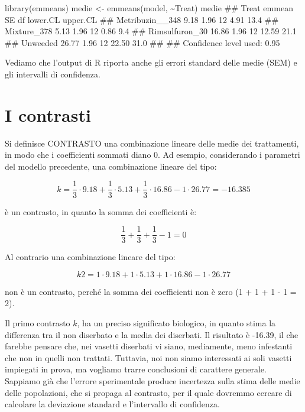 \documentclass[a4paper,12pt,oneside]{book}
\newenvironment{Shaded}{\begin{snugshade}}{\end{snugshade}}
\newcommand{\SpecialCharTok}[1]{#1}
\newcommand{\DocumentationTok}[1]{#1}
\newcommand{\OtherTok}[1]{#1}
\newcommand{\FunctionTok}[1]{#1}
\newcommand{\NormalTok}[1]{#1}
\begin{document}
\begin{Shaded}
\begin{Highlighting}[]
\FunctionTok{library}\NormalTok{(emmeans)}
\NormalTok{medie }\OtherTok{\textless{}{-}} \FunctionTok{emmeans}\NormalTok{(model, }\SpecialCharTok{\textasciitilde{}}\NormalTok{Treat)}
\NormalTok{medie}
\DocumentationTok{\#\#  Treat           emmean   SE df lower.CL upper.CL}
\DocumentationTok{\#\#  Metribuzin\_\_348   9.18 1.96 12     4.91     13.4}
\DocumentationTok{\#\#  Mixture\_378       5.13 1.96 12     0.86      9.4}
\DocumentationTok{\#\#  Rimsulfuron\_30   16.86 1.96 12    12.59     21.1}
\DocumentationTok{\#\#  Unweeded         26.77 1.96 12    22.50     31.0}
\DocumentationTok{\#\# }
\DocumentationTok{\#\# Confidence level used: 0.95}
\end{Highlighting}
\end{Shaded}

Vediamo che l'output di R riporta anche gli errori standard delle medie (SEM) e gli intervalli di confidenza.

\hypertarget{i-contrasti}{%
\section{I contrasti}\label{i-contrasti}}

Si definisce CONTRASTO una combinazione lineare delle medie dei trattamenti, in modo che i coefficienti sommati diano 0. Ad esempio, considerando i parametri del modello precedente, una combinazione lineare del tipo:

\[k = \frac{1}{3} \cdot 9.18 + \frac{1}{3} \cdot 5.13 + \frac{1}{3} \cdot 16.86 - 1 \cdot 26.77  = -16.385\]

è un contrasto, in quanto la somma dei coefficienti è:

\[\frac{1}{3} + \frac{1}{3} + \frac{1}{3} - 1 = 0\]

Al contrario una combinazione lineare del tipo:

\[k2 = 1 \cdot 9.18 + 1 \cdot 5.13 + 1 \cdot 16.86 - 1 \cdot 26.77\]

non è un contrasto, perché la somma dei coefficienti non è zero (1 + 1 + 1 - 1 = 2).

Il primo contrasto \(k\), ha un preciso significato biologico, in quanto stima la differenza tra il non diserbato e la media dei diserbati. Il risultato è -16.39, il che farebbe pensare che, nei vasetti diserbati vi siano, mediamente, meno infestanti che non in quelli non trattati. Tuttavia, noi non siamo interessati ai soli vasetti impiegati in prova, ma vogliamo trarre conclusioni di carattere generale. Sappiamo già che l'errore sperimentale produce incertezza sulla stima delle medie delle popolazioni, che si propaga al contrasto, per il quale dovremmo cercare di calcolare la deviazione standard e l'intervallo di confidenza.
\end{document}
